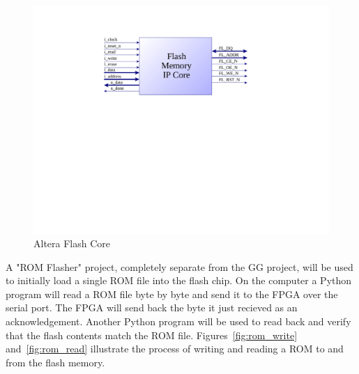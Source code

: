 \documentclass{article}
\begin{document}
\begin{figure}[H]
\centering
\includegraphics[scale=0.5]{flash_core.pdf}
\caption{Altera Flash Core}
\label{fig:flash_core}
\end{figure}

A "ROM Flasher" project, completely separate from the GG project,
will be used to initially load a single ROM file into the flash chip.
On the computer a Python program will read a ROM file byte by byte
and send it to the FPGA over the serial port. The FPGA will send back
the byte it just recieved as an acknowledgement. Another
Python program will be used to read back and verify that the flash contents
match the ROM file. Figures~\ref{fig:rom_write} and~\ref{fig:rom_read}
illustrate the process of writing and reading a ROM to and from the
flash memory.
\end{document}
